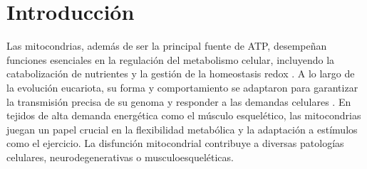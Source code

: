 \section{Introducción}

Las mitocondrias, además de ser la principal fuente de ATP, desempeñan funciones esenciales en la regulación del metabolismo celular, incluyendo la catabolización de nutrientes y la gestión de la homeostasis redox . A lo largo de la evolución eucariota, su forma y comportamiento se adaptaron para garantizar la transmisión precisa de su genoma y responder a las demandas celulares . En tejidos de alta demanda energética como el músculo esquelético, las mitocondrias juegan un papel crucial en la flexibilidad metabólica y la adaptación a estímulos como el ejercicio. La disfunción mitocondrial contribuye a diversas patologías celulares, neurodegenerativas o musculoesqueléticas. 
